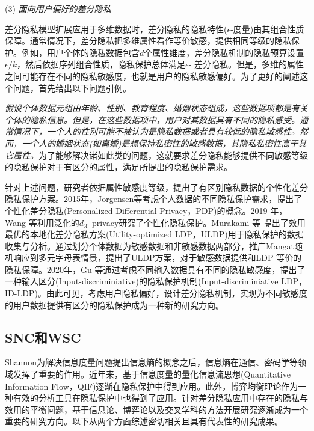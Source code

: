 (3) {\em 面向用户偏好的差分隐私}

差分隐私模型扩展应用于多维数据时，差分隐私的隐私特性($\epsilon$-度量)由其组合性质保障。通常情况下，差分隐私把多维属性看作等价敏感，提供相同等级的隐私保护。例如，用户个体的隐私数据包含$d$个属性维度，差分隐私机制的隐私预算设置$\epsilon/k$，然后依据序列组合性质，隐私保护总体满足$\epsilon$- 差分隐私。但是，多维的属性之间可能存在不同的隐私敏感度，也就是用户的隐私敏感偏好。为了更好的阐述这个问题，首先给出以下问题引例。

{\em 假设个体数据元组由年龄、性别、教育程度、婚姻状态组成，这些数据项都是有关个体的隐私信息。但是，在这些数据项中，用户对其数据具有不同的隐私感受。通常情况下，一个人的性别可能不被认为是隐私数据或者具有较低的隐私敏感性。然而，一个人的婚姻状态(如离婚)是想保持私密性的敏感数据，其隐私私密性高于其它属性。}为了能够解决诸如此类的问题，这就要求差分隐私能够提供不同敏感等级的隐私保护对于有区分的属性，满足所提出的隐私保护需求。

针对上述问题，研究者依据属性敏感度等级，提出了有区别隐私数据的个性化差分隐私保护方案\cite{chen2016private}。2015年，Jorgensen等\cite{jorgensen2015conservative}考虑个人数据的不同隐私保护需求，提出了个性化差分隐私(Personalized Differential Privacy，PDP)的概念。2019 年，Wang 等\cite{wang2019personalized}利用泛化的$d_{\mathcal{X}}$-privacy\cite{chatzikokolakis2013broadening}研究了个性化隐私保护。Murakami 等\cite{murakami2019utility} 提出了效用最优的本地化差分隐私方案(Utility-optimized LDP，ULDP)用于隐私保护的数据收集与分析。通过划分个体数据为敏感数据和非敏感数据两部分，推广Mangat\cite{mangat1994an}随机响应到多元字母表情景，提出了ULDP方案，对于敏感数据提供和LDP 等价的隐私保障。2020年，Gu 等\cite{gu2020providing}通过考虑不同输入数据具有不同的隐私敏感度，提出了一种输入区分(Input-discriminiative)的隐私保护机制(Input-discriminiative LDP，ID-LDP)。由此可见，考虑用户隐私偏好，设计差分隐私机制，实现为不同敏感度的用户数据提供有区分的隐私保护成为一种新的研究方向。


\subsection{SNC和WSC}
Shannon\cite{shannon1948a}为解决信息度量问题提出信息熵的概念之后，信息熵在通信、密码学等领域发挥了重要的作用。近年来，基于信息度量的量化信息流思想(Quantitative Information Flow，QIF)\cite{smith2009on}逐渐在隐私保护中得到应用。此外，博弈均衡理论作为一种有效的分析工具在隐私保护中也得到了应用。针对差分隐私应用中存在的隐私与效用的平衡问题，基于信息论、博弈论以及交叉学科的方法开展研究逐渐成为一个重要的研究方向。以下从两个方面综述密切相关且具有代表性的研究成果。

